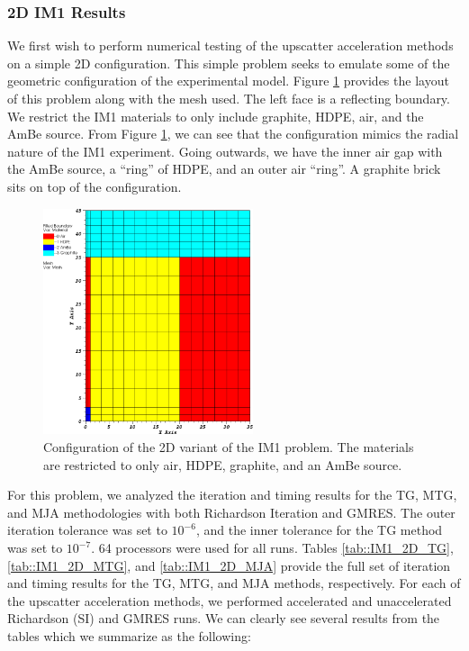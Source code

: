 \subsubsection{2D IM1 Results}
\label{sec::DSA_Results_IM1_2D}

We first wish to perform numerical testing of the upscatter acceleration methods on a simple 2D configuration. This simple problem seeks to emulate some of the geometric configuration of the experimental model. Figure \ref{fig::IM1_config_2D} provides the layout of this problem along with the mesh used. The left face is a reflecting boundary. We restrict the IM1 materials to only include graphite, HDPE, air, and the AmBe source. From Figure \ref{fig::IM1_config_2D}, we can see that the configuration mimics the radial nature of the IM1 experiment. Going outwards, we have the inner air gap with the AmBe source, a ``ring'' of HDPE, and an outer air ``ring''. A graphite brick sits on top of the configuration.

\begin{figure}
\centering
\includegraphics[width=0.55\textwidth]{figures/sec_DSA/2D_IM1_Variant_Layout.png}
\caption{Configuration of the 2D variant of the IM1 problem. The materials are restricted to only air, HDPE, graphite, and an AmBe source.}
\label{fig::IM1_config_2D}
\end{figure}

For this problem, we analyzed the iteration and timing results for the TG, MTG, and MJA methodologies with both Richardson Iteration and GMRES. The outer iteration tolerance was set to $10^{-6}$, and the inner tolerance for the TG method was set to $10^{-7}$. 64 processors were used for all runs. Tables \ref{tab::IM1_2D_TG}, \ref{tab::IM1_2D_MTG}, and \ref{tab::IM1_2D_MJA} provide the full set of iteration and timing results for the TG, MTG, and MJA methods, respectively. For each of the upscatter acceleration methods, we performed accelerated and unaccelerated Richardson (SI) and GMRES runs. We can clearly see several results from the tables which we summarize as the following:

